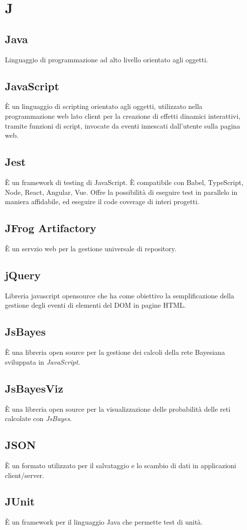 \section*{J}

\subsection{Java}
Linguaggio di programmazione ad alto livello orientato agli oggetti. 

\subsection{JavaScript}
È un linguaggio di scripting orientato agli oggetti, utilizzato nella programmazione web lato client per la creazione di effetti dinamici interattivi, tramite funzioni di script, invocate da eventi innescati dall'utente sulla pagina web.

\subsection{Jest} 
È un framework di testing di JavaScript. È compatibile con Babel, TypeScript, Node, React, Angular, Vue. Offre la possibilità di eseguire test in parallelo in maniera affidabile, ed eseguire il code coverage di interi progetti.

\subsection{JFrog Artifactory} 
È un servzio web per la gestione universale di repository.

\subsection{jQuery}
Libreria javascript opensource che ha come obiettivo la semplificazione della gestione degli eventi di elementi del DOM in pagine HTML. 

\subsection{JsBayes}
È una libreria open source per la gestione dei calcoli della rete Bayesiana sviluppata in \textit{JavaScript}.

\subsection{JsBayesViz}
È una libreria open source per la visualizzazione delle probabilità delle reti calcolate con \textit{JsBayes}.

\subsection{JSON}
È un formato utilizzato per il salvataggio e lo scambio di dati in applicazioni client/server.

\subsection{JUnit}
È un framework per il linguaggio Java che permette test di unità.